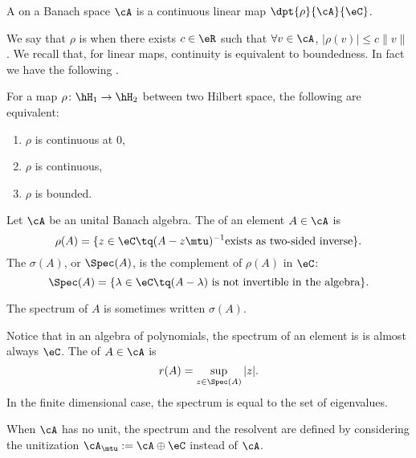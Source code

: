 \begin{definition}			\label{def:fonctionelle}
A  on a Banach space $\cA$ is a continuous linear map $\dpt{\rho}{\cA}{\eC}$. 
\end{definition}
We say that $\rho$ is  when there exists $c\in\eR$ such that $\forall v\in\cA$,  $|\rho(v)|\leq c\|v\|$.  We recall that, for linear maps, continuity is equivalent to boundedness. In fact we have the following \cite{Ops_Hilb_space}.
\begin{proposition}
	For a map $\rho\colon \hH_1\to \hH_2$ between two Hilbert space, the following are equivalent:
	\begin{enumerate}
	\item $\rho$ is continuous at $0$,
	\item $\rho$ is continuous,
	\item $\rho$ is bounded.
	\end{enumerate}
\end{proposition}

\begin{definition} 
	Let $\cA$ be an unital Banach algebra. The  of an element $A\in \cA$ is
	\begin{equation}
	  \rho(A)=\{ z\in\eC\tq(A-z\mtu)^{-1}\text{exists as two-sided inverse}  \}.
	\end{equation}
	The  $\sigma(A)$, or $\Spec(A)$, is the complement of $\rho(A)$ in $\eC$:
	\begin{equation}
	\Spec(A)=\{ \lambda\in\eC\tq\text{$(A-\lambda)$ is not invertible in the algebra} \}.
	\end{equation}
\end{definition}
The spectrum of $A$ is sometimes written $\sigma(A)$. 


Notice that in an algebra of polynomials, the spectrum of an element is is almost always $\eC$. The  of $A\in\cA$ is 
\begin{equation}
   r(A)=\sup_{z\in\Spec(A)}|z|.
\end{equation} \label{def:spectre}
In the finite dimensional case, the spectrum is equal to the set of eigenvalues.

\begin{remark}
When $\cA$ has no unit, the spectrum and the resolvent are defined by considering the unitization $\cA_{\mtu}:=\cA\oplus\eC$ instead of $\cA$.
\end{remark}

